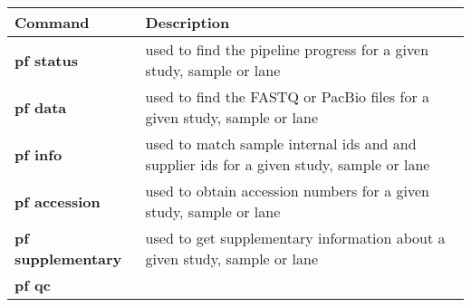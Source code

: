 \documentclass[11pt]{article}
\begin{document}
\begin{longtable}[]{@{}ll@{}}
\hline
\begin{minipage}[b]{0.47\columnwidth}\raggedright
Command\strut
\end{minipage} & \begin{minipage}[b]{0.47\columnwidth}\raggedright
Description\strut
\end{minipage}\tabularnewline
\hline
\endhead
\begin{minipage}[t]{0.47\columnwidth}\raggedright
\textbf{pf status}\strut
\end{minipage} & \begin{minipage}[t]{0.47\columnwidth}\raggedright
used to find the pipeline progress for a given study, sample or
lane\strut
\end{minipage}\tabularnewline
\begin{minipage}[t]{0.47\columnwidth}\raggedright
\textbf{pf data}\strut
\end{minipage} & \begin{minipage}[t]{0.47\columnwidth}\raggedright
used to find the FASTQ or PacBio files for a given study, sample or
lane\strut
\end{minipage}\tabularnewline
\begin{minipage}[t]{0.47\columnwidth}\raggedright
\textbf{pf info}\strut
\end{minipage} & \begin{minipage}[t]{0.47\columnwidth}\raggedright
used to match sample internal ids and and supplier ids for a given
study, sample or lane\strut
\end{minipage}\tabularnewline
\begin{minipage}[t]{0.47\columnwidth}\raggedright
\textbf{pf accession}\strut
\end{minipage} & \begin{minipage}[t]{0.47\columnwidth}\raggedright
used to obtain accession numbers for a given study, sample or lane\strut
\end{minipage}\tabularnewline
\begin{minipage}[t]{0.47\columnwidth}\raggedright
\textbf{pf supplementary}\strut
\end{minipage} & \begin{minipage}[t]{0.47\columnwidth}\raggedright
used to get supplementary information about a given study, sample or
lane\strut
\end{minipage}\tabularnewline
\begin{minipage}[t]{0.47\columnwidth}\raggedright
\textbf{pf qc}\strut

\end{minipage}
\end{longtable}
\end{document}
